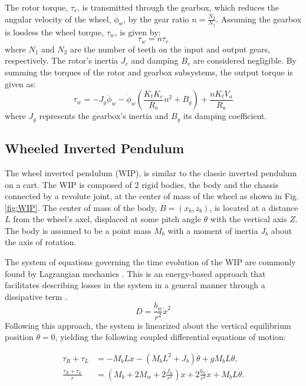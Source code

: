     The rotor torque, $\tau_r$, is transmitted through the gearbox, which 
    reduces the angular velocity of the wheel, $\dot{\phi}_w$, by the gear ratio $n = \frac{N_2}{N_1}$. 
    Assuming the gearbox is lossless the wheel torque, $\tau_w$, is given by:
    \begin{equation}
            \tau_w = n\tau_r
    \end{equation}
    where $N_1$ and $N_2$ are the number of teeth on the input and output gears, respectively.
    The rotor's inertia $J_r$ and damping $B_r$ are considered negligible.
    By summing the torques of the rotor and gearbox subsystems, the output torque is given as:
    \begin{equation}
        \tau_w = - J_g \ddot{\phi}_w - \dot{\phi}_w \left( \frac{K_t K_e}{R_a} n^2 + B_g \right) + \frac{n K_t V_a}{R_a}
    \end{equation}
    where $J_g$ represents the gearbox's inertia and $B_g$ its damping coefficient.

    \subsection{Wheeled Inverted Pendulum}
    The wheel inverted pendulum (WIP), is similar to the classic inverted pendulum on a cart. 
    The WIP is composed of 2 rigid bodies, the body and the chassis connected by a revolute joint, 
    at the center of mass of the wheel as shown in Fig.\ref{fig:WIP}. 
    The center of mass of the body, $B=(x_b,z_b)$, 
    is located at a distance $L$ from the wheel's axel, displaced at some pitch angle $\theta$ with 
    the vertical axis $Z$. The body is assumed to be a point mass $M_b$ with a moment of inertia $J_b$ 
    about the axis of rotation. 
    
    The system of equations governing the time evolution of the WIP are 
    commonly found by Lagrangian mechanics \cite{AdvancedWIP}. This is an energy-based approach that
    facilitates describing losses in the system in a general manner through a 
    dissipative term \cite{frankovsky2017modeling} \cite{ModelingWIPLagrange}.
    \begin{equation}
        D = \frac{b_w}{r^2} \dot{x}^2
    \end{equation}
    Following this approach, the system is linearized about the vertical equilibrium position $\theta = 0$,
    yielding the following coupled differential equations of motion:

    \begin{subequations}
        \begin{align}
            \tau_R + \tau_L &= - M_b L \ddot{x}  
            - (M_b L^2 + J_b) \ddot{\theta}  
            + g M_b L \theta, \\
            \frac{\tau_R + \tau_L}{r} &= \left( M_b + 2M_w + 2\frac{J_w}{r^2} \right) \ddot{x}  
            + 2\frac{b_w}{r^2} \dot{x}  
            + M_b L \ddot{\theta}.
        \end{align}
        \label{eq:2DOFWIP}
    \end{subequations}

